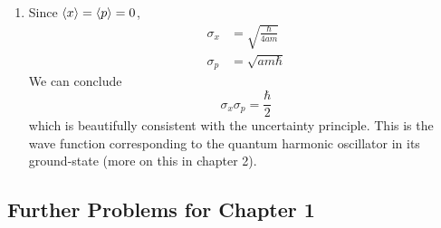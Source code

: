 \documentclass[a4paper]{article}
\begin{document}
\begin{enumerate}[label=(\alph*)]
\begin{align*}
			   & = 0 \\
		\braket{p^{2}} & = -\hbar^{2}\int^{\infty}_{-\infty} \Psi^{*}\frac{\partial^2 \Psi}{\partial x^2} \, dx \\
			       & = -\abs{A}^{2}\hbar^{2}\int^{\infty}_{-\infty} \!\left( -\alpha + \alpha^{2}x^{2} \right)e^{-\alpha x^{2}} \, dx \\
			       & = \abs{A}^{2} \!\left[ \alpha \hbar^{2}\int^{\infty}_{-\infty} e^{-\alpha x^{2}} \, dx - 2 \alpha^{2}\hbar^{2}\int^{\infty}_{0} x^{2}e^{-\alpha x^{2}} \, dx \right]  \\
			       & = \abs{A}^{2} \!\left[ \alpha \hbar^{2}\sqrt{\frac{\pi}{\alpha}} - \frac{\alpha \hbar^{2}}{2}\sqrt{\frac{\pi}{\alpha}} \right] \\
			       & = \frac{\abs{A}^{2}\alpha \hbar^{2}}{2}\sqrt{\frac{\pi}{\alpha}}
	\end{align*}
	where \( \alpha = 2am / \hbar \). Simplifying the nonzero expecations gives us 
	\begin{align*}
		\braket{x^{2}} & = \frac{1}{2}\!\left( \frac{2am}{\pi \hbar} \right)^{1/2}\!\left( \frac{\hbar}{2am} \right)^{3/2}\sqrt{\pi} = \frac{\hbar}{4am} \\
		\braket{p^{2}} & = \frac{1}{2}\!\left( \frac{2am}{\pi \hbar} \right)^{1/2}\!\left( \frac{2am}{\hbar} \right)^{1/2}\hbar^{2}\sqrt{\pi} = am \hbar
	\end{align*}
	\item Since \( \braket{x} = \braket{p} = 0 \), 
	\begin{align*}
		\sigma_{x} & = \sqrt{\frac{\hbar}{4am}} \\
		\sigma_{p} & = \sqrt{am \hbar}
	\end{align*}
	We can conclude
	\[
		\sigma_{x}\sigma_{p} = \frac{\hbar}{2}
	\]
	which is beautifully consistent with the uncertainty principle. This is the wave function corresponding to the quantum harmonic oscillator in its ground-state (more on this in chapter 2).
\end{enumerate}

\newpage
\subsection{\textsf{Further Problems for Chapter 1}}
\end{document}
